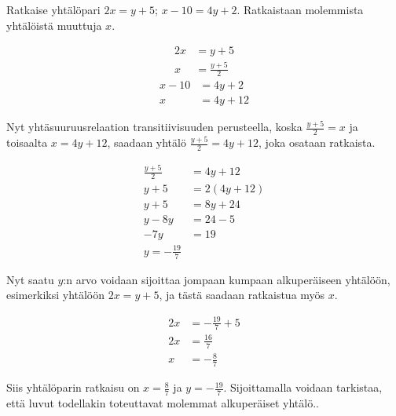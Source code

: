 \begin{esimerkki}
Ratkaise yhtälöpari $2x=y+5$; $x-10=4y+2$. Ratkaistaan molemmista yhtälöistä muuttuja $x$. 
	
	\begin{align*}
	    2x &= y+5 \\
	    x &= \frac{y+5}{2}
	\end{align*}
	\begin{align*}
	    x-10 &= 4y+2 \\
	    x &= 4y+12
	\end{align*}
	
Nyt yhtäsuuruusrelaation transitiivisuuden perusteella, koska $\frac{y+5}{2}=x$ ja toisaalta $x=4y+12$, saadaan yhtälö $\frac{y+5}{2}=4y+12$, joka osataan ratkaista.

\begin{align*}
	\frac{y+5}{2} &= 4y+12 \\
	y+5 &= 2(4y+12)\\
	y+5 &= 8y+24 \\
	y -8y&= 24-5 \\
	-7y &= 19 \\
	y=-\frac{19}{7}
\end{align*}

Nyt saatu $y$:n arvo voidaan sijoittaa jompaan kumpaan alkuperäiseen yhtälöön, esimerkiksi yhtälöön $2x=y+5$, ja tästä saadaan ratkaistua myös $x$.

\begin{align*}
      2x &= -\frac{19}{7}+5\\
      2x &= \frac{16}{7} \\
      x &= -\frac{8}{7}
\end{align*}

Siis yhtälöparin ratkaisu on $x=\frac{8}{7}$ ja $y=-\frac{19}{7}$. Sijoittamalla voidaan tarkistaa, että luvut todellakin toteuttavat molemmat alkuperäiset yhtälö..
\end{esimerkki}

